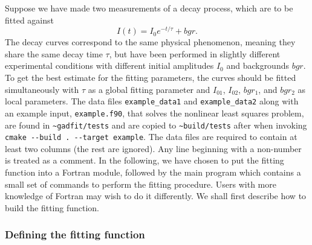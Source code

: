 \documentclass{article}
\begin{document}
Suppose we have made two measurements of a decay process, which are to be fitted against
\begin{equation}
  \label{eq:exp_decay}
  I(t) = I_0e^{-t/\tau} + bgr.
\end{equation}
The decay curves correspond to the same physical phenomenon, meaning they share the same decay time $\tau$, but have been performed in slightly different experimental conditions with different initial amplitudes $I_0$ and backgrounds $bgr$. To get the best estimate for the fitting parameters, the curves should be fitted simultaneously with $\tau$ as a global fitting parameter and $I_{01}$, $I_{02}$, $bgr_1$, and $bgr_2$ as local parameters. The data files \verb+example_data1+ and \verb+example_data2+ along with an example input, \verb+example.f90+, that solves the nonlinear least squares problem, are found in \verb+~gadfit/tests+ and are copied to \verb+~build/tests+ after when invoking \verb+cmake --build . --target example+. The data files are required to contain at least two columns (the rest are ignored). Any line beginning with a non-number is treated as a comment. In the following, we have chosen to put the fitting function into a Fortran module, followed by the main program which contains a small set of commands to perform the fitting procedure. Users with more knowledge of Fortran may wish to do it differently. We shall first describe how to build the fitting function.

\subsubsection{Defining the fitting function}
\end{document}
